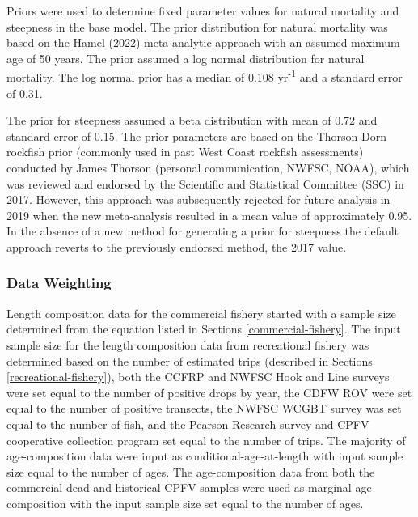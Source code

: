 \documentclass[11pt,
  english,
  letterpaper,
]{article}
\begin{document}
Priors were used to determine fixed parameter values for natural mortality and steepness in the base model. The prior distribution for natural mortality was based on the Hamel (2022) meta-analytic approach with an assumed maximum age of 50 years. The prior assumed a log normal distribution for natural mortality. The log normal prior has a median of 0.108 yr\textsuperscript{-1} and a standard error of 0.31.

The prior for steepness assumed a beta distribution with mean of 0.72 and standard error of 0.15. The prior parameters are based on the Thorson-Dorn rockfish prior (commonly used in past West Coast rockfish assessments) conducted by James Thorson (personal communication, NWFSC, NOAA), which was reviewed and endorsed by the Scientific and Statistical Committee (SSC) in 2017. However, this approach was subsequently rejected for future analysis in 2019 when the new meta-analysis resulted in a mean value of approximately 0.95. In the absence of a new method for generating a prior for steepness the default approach reverts to the previously endorsed method, the 2017 value.

\hypertarget{data-weighting}{%
\subsubsection{Data Weighting}\label{data-weighting}}

Length composition data for the commercial fishery started with a sample size determined from the equation listed in Sections \ref{commercial-fishery}. The input sample size for the length composition data from recreational fishery was determined based on the number of estimated trips (described in Sections \ref{recreational-fishery}), both the CCFRP and NWFSC Hook and Line surveys were set equal to the number of positive drops by year, the CDFW ROV were set equal to the number of positive transects, the NWFSC WCGBT survey was set equal to the number of fish, and the Pearson Research survey and CPFV cooperative collection program set equal to the number of trips. The majority of age-composition data were input as conditional-age-at-length with input sample size equal to the number of ages. The age-composition data from both the commercial dead and historical CPFV samples were used as marginal age-composition with the input sample size set equal to the number of ages.
\end{document}
